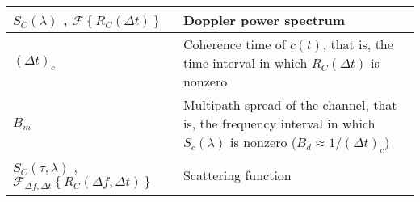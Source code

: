 \begin{xltabular}{\textwidth}{XX}
	\(S_C(\lambda)\) \cite{proakisDigitalCommunications2007}, \(\mathcal{F}\left\{ R_C (\Delta t) \right\}\) \cite{goldsmithWirelessCommunications2005}                                                & Doppler power spectrum                                                                                                                                                          \\ \hline
	\((\Delta t)_c\)                                                                                                                                                                                   & Coherence time of \(c(t)\), that is, the time interval in which \(R_C(\Delta t)\) is nonzero \cite{proakisDigitalCommunications2007}                                            \\ \hline
	\(B_m\)                                                                                                                                                                                            & Multipath spread of the channel, that is, the frequency interval in which \(S_c(\lambda)\) is nonzero (\(B_d \approx 1/(\Delta t)_c \)) \cite{proakisDigitalCommunications2007} \\ \hline
	\(S_C(\tau, \lambda)\) \cite{proakisDigitalCommunications2007}, \(\mathcal{F}_{\Delta f, \Delta t}\left\{ R_C (\Delta f, \Delta t) \right\}\) \cite{goldsmithWirelessCommunications2005}           & Scattering function                                                                                                                                                             \\ \hline
\end{xltabular}
